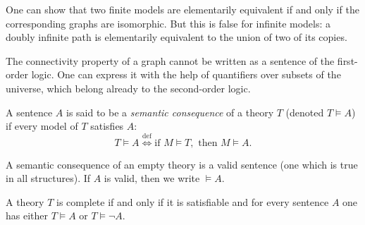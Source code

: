 \begin{page}
\setcounter{section}{3}
\setcounter{subsection}{1}
\setcounter{dfn}{9}
\label{portion:683}

\begin{rem}
One can show that two finite models are elementarily equivalent if and only if the corresponding graphs are isomorphic.
But this is false for infinite models: a doubly infinite path is elementarily equivalent to the union of two of its copies.

The connectivity property of a graph cannot be written as a sentence of the first-order logic.
One can express it with the help of quantifiers over subsets of the universe, which belong already to the second-order logic.
\end{rem}

\end{page}

\begin{page}
\setcounter{section}{3}
\setcounter{subsection}{1}
\setcounter{dfn}{10}
\label{portion:686}

\begin{dfn}
A sentence $A$ is said to be a \emph{semantic consequence} of a theory $T$ (denoted $T \vDash A$) if every model of $T$ satisfies $A$:
\[
T \vDash A \stackrel{\mathrm{def}}{\Longleftrightarrow} \text{if } M \vDash T, \text{ then } M \vDash A.
\]
\end{dfn}

\end{page}

\begin{page}
\setcounter{section}{3}
\setcounter{subsection}{1}
\setcounter{dfn}{11}
\label{portion:689}

\begin{exl}
A semantic consequence of an empty theory is a valid sentence (one which is true in all structures).
If $A$ is valid, then we write $\vDash A$.
\end{exl}

\end{page}

\begin{page}
\setcounter{section}{3}
\setcounter{subsection}{1}
\setcounter{dfn}{12}
\label{portion:692}

\begin{lem}
A theory $T$ is complete if and only if it is satisfiable and for every sentence $A$ one has either $T \vDash A$ or $T \vDash \neg A$.
\end{lem}

\end{page}

